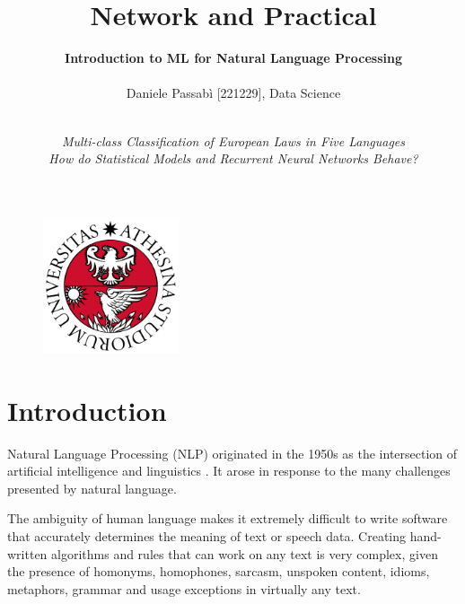 \documentclass[letterpaper,11pt]{article}
\begin{document}
\title{\textbf{Network and Practical}}
\author{\textbf{Introduction to ML for Natural Language Processing}\\ \\ Daniele Passabì [221229], Data Science\\}

\date{\textit{\\Multi-class Classification of European Laws in Five Languages\\How do Statistical Models and Recurrent Neural Networks Behave?}}
\maketitle
\thispagestyle{empty}

\begin{figure}[H] 
  \centering
  \includegraphics[width=4cm]{logo.png}
\end{figure}

\newpage
\setcounter{tocdepth}{2}
\tableofcontents
\thispagestyle{empty}

\newpage
\clearpage
{}



\section{Introduction}

Natural Language Processing (NLP) originated in the 1950s as the intersection of
artificial intelligence and linguistics \cite{nadkarni2011natural}. It arose in response to the many challenges presented by natural language.

The ambiguity of human language makes it extremely difficult to write software that accurately determines the meaning of text or speech data. Creating hand-written algorithms and rules that can work on any text is very complex, given the presence of homonyms, homophones, sarcasm, unspoken content, idioms, metaphors, grammar and usage exceptions in virtually any text.
\end{document}
